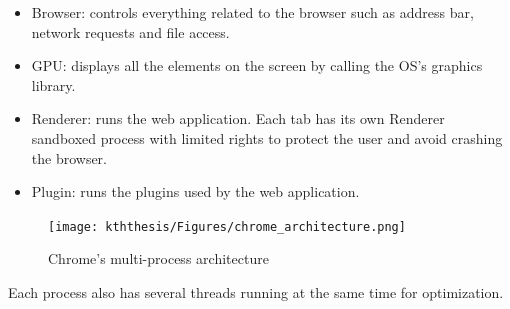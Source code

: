 \documentclass{kththesis}
\begin{document}
\begin{itemize}
    \item Browser: controls everything related to the browser such as address bar, network requests and file access.
    \item GPU: displays all the elements on the screen by calling the OS's graphics library.
    \item Renderer: runs the web application. Each tab has its own Renderer sandboxed process with limited rights to protect the user and avoid crashing the browser.
    \item Plugin: runs the plugins used by the web application.
\end{itemize}

\begin{figure}
    \centering
    \texttt{[image: kththesis/Figures/chrome\_architecture.png]}
    \caption[Chrome's multi-process architecture]{Chrome's multi-process architecture \footnotemark}
    \label{fig:chrome_architecture}
\end{figure}


Each process also has several threads running at the same time for optimization.
 
\end{document}
